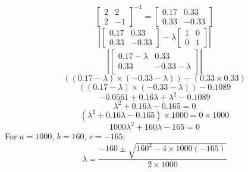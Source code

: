 \documentclass[12pt,a4paper]{paper}
\begin{document}
\begin{enumerate}
\begin{enumerate}
\begin{equation}
\end{equation}
\begin{equation}
\left[\begin{array}{cc}2 & 2 \\ 2 & -1\end{array}\right]^{-1} = \left[\begin{array}{cc}0.17 & 0.33 \\ 0.33 & -0.33\end{array}\right]
\end{equation}
\begin{equation}
\left|\left[\begin{array}{cc}0.17 & 0.33 \\ 0.33 & -0.33\end{array}\right]-\lambda \left[\begin{array}{cc}1 & 0 \\0 & 1\end{array}\right]\right|
\end{equation}
\begin{equation}
\left|\left[\begin{array}{cc}0.17-\lambda & 0.33 \\ 0.33 & -0.33-\lambda\end{array}\right]\right|
\end{equation}
\begin{equation}
\left(\left(0.17 - \lambda \right) \times \left(-0.33- \lambda \right)\right) - \left(0.33 \times 0.33\right)
\end{equation}
\begin{equation}
\left(\left(0.17 - \lambda \right) \times \left(-0.33- \lambda \right)\right) - 0.1089
\end{equation}
\begin{equation}
-0.0561 + 0.16\lambda + \lambda^2 - 0.1089
\end{equation}
\begin{equation}
\lambda^2 + 0.16\lambda - 0.165 = 0
\end{equation}
\begin{equation}
\left(\lambda^2 + 0.16\lambda - 0.165\right) \times 1000 = 0 \times 1000
\end{equation}
\begin{equation}
1000\lambda ^2 + 160\lambda - 165=0
\end{equation}
For $a=1000$, $b=160$, $c=-165$:
\begin{equation}
\lambda = \frac{-160\pm\sqrt{160^2-4 \times 1000\left(-165\right)}}{2 \times 1000}
\end{equation}

\end{enumerate}
\end{enumerate}
\end{document}
